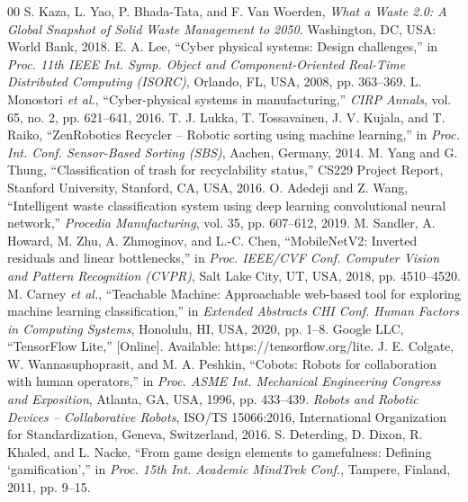 ﻿\documentclass[conference]{IEEEtran}
\begin{document}

\begin{thebibliography}{00}
 S. Kaza, L. Yao, P. Bhada-Tata, and F. Van Woerden, \emph{What a Waste 2.0: A Global Snapshot of Solid Waste Management to 2050}. Washington, DC, USA: World Bank, 2018.
 E. A. Lee, ``Cyber physical systems: Design challenges,'' in \emph{Proc. 11th IEEE Int. Symp. Object and Component-Oriented Real-Time Distributed Computing (ISORC)}, Orlando, FL, USA, 2008, pp. 363--369.
 L. Monostori \emph{et al.}, ``Cyber-physical systems in manufacturing,'' \emph{CIRP Annals}, vol. 65, no. 2, pp. 621--641, 2016.
 T. J. Lukka, T. Tossavainen, J. V. Kujala, and T. Raiko, ``ZenRobotics Recycler -- Robotic sorting using machine learning,'' in \emph{Proc. Int. Conf. Sensor-Based Sorting (SBS)}, Aachen, Germany, 2014.
 M. Yang and G. Thung, ``Classification of trash for recyclability status,'' CS229 Project Report, Stanford University, Stanford, CA, USA, 2016.
 O. Adedeji and Z. Wang, ``Intelligent waste classification system using deep learning convolutional neural network,'' \emph{Procedia Manufacturing}, vol. 35, pp. 607--612, 2019.
 M. Sandler, A. Howard, M. Zhu, A. Zhmoginov, and L.-C. Chen, ``MobileNetV2: Inverted residuals and linear bottlenecks,'' in \emph{Proc. IEEE/CVF Conf. Computer Vision and Pattern Recognition (CVPR)}, Salt Lake City, UT, USA, 2018, pp. 4510--4520.
 M. Carney \emph{et al.}, ``Teachable Machine: Approachable web-based tool for exploring machine learning classification,'' in \emph{Extended Abstracts CHI Conf. Human Factors in Computing Systems}, Honolulu, HI, USA, 2020, pp. 1--8.
 Google LLC, ``TensorFlow Lite,'' [Online]. Available: https://tensorflow.org/lite.
 J. E. Colgate, W. Wannasuphoprasit, and M. A. Peshkin, ``Cobots: Robots for collaboration with human operators,'' in \emph{Proc. ASME Int. Mechanical Engineering Congress and Exposition}, Atlanta, GA, USA, 1996, pp. 433--439.
 \emph{Robots and Robotic Devices -- Collaborative Robots}, ISO/TS 15066:2016, International Organization for Standardization, Geneva, Switzerland, 2016.
 S. Deterding, D. Dixon, R. Khaled, and L. Nacke, ``From game design elements to gamefulness: Defining `gamification','' in \emph{Proc. 15th Int. Academic MindTrek Conf.}, Tampere, Finland, 2011, pp. 9--15.

\end{thebibliography}
\end{document}

